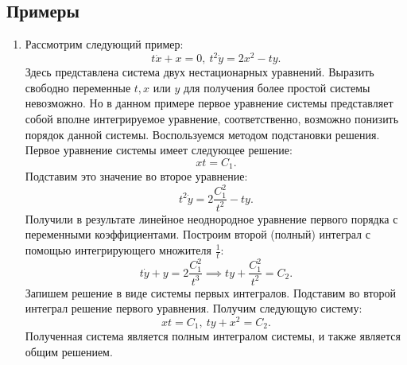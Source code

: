 	\subsection{Примеры}

		\begin{enumerate}

			\item Рассмотрим следующий пример:
				\[ t\dot{x} + x = 0, ~ t^2 \dot{y} = 2x^2 - ty. \]
				Здесь представлена система двух нестационарных уравнений. Выразить свободно переменные $t, x$ или $y$ для получения более простой системы невозможно. Но в данном примере первое уравнение системы представляет собой вполне интегрируемое уравнение, соответственно, возможно понизить порядок данной системы. Воспользуемся методом подстановки решения. Первое уравнение системы имеет следующее решение:
				\[ xt = C_1. \]
				Подставим это значение во второе уравнение:
				\[ t^2 \dot{y} = 2 \frac{C_1^2}{t^2} - ty. \]
				Получили в результате линейное неоднородное уравнение первого порядка с переменными коэффициентами. Построим второй (полный) интеграл с помощью интегрирующего множителя $\frac{1}{t}$:
				\[ t\dot{y} + y = 2 \frac{C_1^2}{t^3} \implies ty + \frac{C_1^2}{t^2} = C_2. \]
				Запишем решение в виде системы первых интегралов. Подставим во второй интеграл решение первого уравнения. Получим следующую систему:
				\[ xt = C_1, ~ ty + x^2 = C_2. \]
				Полученная система является полным интегралом системы, и также является общим решением.


\end{enumerate}

